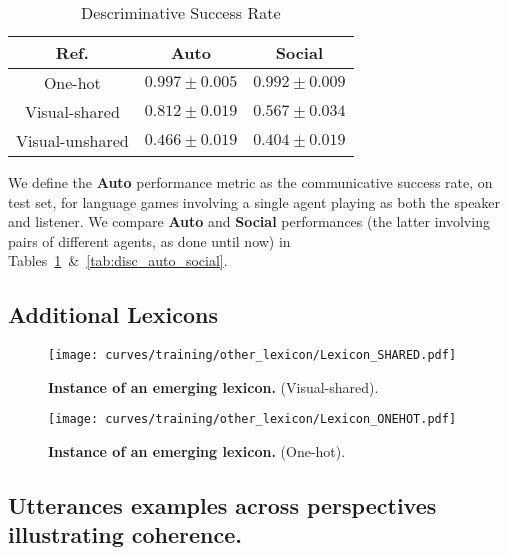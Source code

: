 \def\arraystretch{1.5}
\begin{table}[!h]
\centering
    \begin{tabular}{|c|c|c|}
     \hline
     \textbf{Ref.} & \textbf{Auto} & \textbf{Social}\\
     \hline
     One-hot & $0.997 \pm 0.005$ & $0.992 \pm 0.009$ \\
     Visual-shared & $0.812 \pm 0.019$ & $0.567 \pm 0.034$  \\
     Visual-unshared & $0.466 \pm 0.019$ & $0.404 \pm 0.019$  \\
     \hline
     
    \end{tabular}
    \caption{Descriminative Success Rate}
    \label{tab:desc_auto_social}
\end{table}

We define the \textbf{Auto} performance metric as the communicative success rate, on test set, for language games involving a single agent playing as both the speaker and listener. We compare \textbf{Auto} and \textbf{Social} performances (the latter involving pairs of different agents, as done until now) in Tables~\ref{tab:desc_auto_social}~\&~\ref{tab:disc_auto_social}.


\subsection{Additional Lexicons}
\label{sup:lexicon_one_hot_shared}


\begin{figure}[h!]

\centering
\texttt{[image: curves/training/other\_lexicon/Lexicon\_SHARED.pdf]}
\caption{\textbf{Instance of an emerging lexicon.} (Visual-shared).}
\end{figure}


\begin{figure}[h!]

\centering
    \texttt{[image: curves/training/other\_lexicon/Lexicon\_ONEHOT.pdf]}
    
\caption{\textbf{Instance of an emerging lexicon.} (One-hot).}
\end{figure}

\newpage
\subsection{Utterances examples across perspectives illustrating coherence.}
\label{sup:P-coherence}

